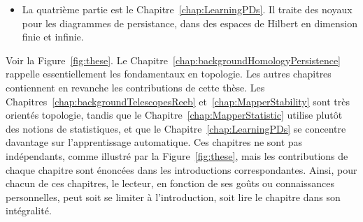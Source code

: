 \begin{itemize}

\item La quatri\`eme partie est le Chapitre~\ref{chap:LearningPDs}. Il traite des noyaux pour les diagrammes de persistance, 
dans des espaces de Hilbert en dimension finie et infinie. 


 
\end{itemize}

Voir la Figure~\ref{fig:these}. Le Chapitre~\ref{chap:backgroundHomologyPersistence} rappelle essentiellement les fondamentaux
en topologie. Les autres chapitres contiennent en revanche les contributions de cette th\`ese.
Les Chapitres~\ref{chap:backgroundTelescopesReeb} et~\ref{chap:MapperStability} sont tr\`es orient\'es topologie, tandis que le Chapitre~\ref{chap:MapperStatistic}
utilise plut\^ot des notions de statistiques, et que le Chapitre~\ref{chap:LearningPDs} se concentre davantage sur l'apprentissage automatique.
Ces chapitres ne sont pas ind\'ependants, comme illustr\'e par la Figure~\ref{fig:these}, mais les contributions de chaque chapitre
sont \'enonc\'ees dans les introductions correspondantes. 
Ainsi, pour chacun de ces chapitres, le lecteur, en fonction de ses go\^uts ou connaissances personnelles, peut soit se limiter \`a
l'introduction, soit lire le chapitre dans son int\'egralit\'e.
%

